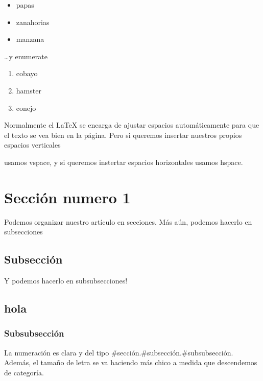 \documentclass[12pt,a4paper]{article}
\begin{document}
\begin{itemize}
 \item papas
 \item zanahorias
 \item manzana
\end{itemize}

\ldots y enumerate   %

\begin{enumerate}
 \item cobayo
 \item hamster
 \item conejo
\end{enumerate}

 

Normalmente el \LaTeX{} se encarga de ajustar espacios automáticamente para que el texto se vea bien en la página. Pero si queremos insertar nuestros propios espacios verticales

\vspace{10mm}

usamos vspace, y si queremos instertar espacios horizontales \hspace{5mm} usamos hspace.


\section{Sección numero 1}

Podemos organizar nuestro artículo en secciones. Más aún, podemos hacerlo en subsecciones

\subsection{Subsección}

Y podemos hacerlo en subsubsecciones!

\subsection{hola}

\subsubsection{Subsubsección}

La numeración es clara y del tipo \#sección.\#subsección.\#subsubsección. Además, el tamaño de letra se va haciendo más chico a medida que descendemos de categoría.

\vspace{5mm}
\end{document}
